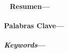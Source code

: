 \newpage
\setcounter{page}{2}
\
\vfill
\vfill
{}
\vspace{0.3cm}
\noindent \textbf{Resumen---}\resumen\ \\
\vspace{0.3cm} \\
\noindent \textbf{Palabras Clave---} \palabrasclave\ \\
\vspace{1.2cm} \\
\vspace{0.3cm}
\vspace{0.3cm} 
\noindent \textbf{\emph{Keywords}---} \palabrasclaveingles\ \\
